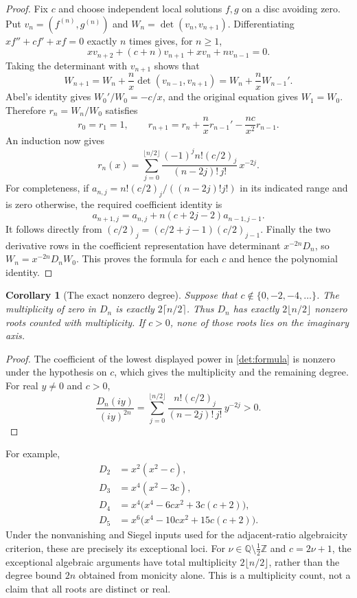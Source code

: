 \documentclass[11pt,a4paper]{article}
\newtheorem{corollary}[theorem]{Corollary}
\theoremstyle{definition}\newtheorem{definition}[theorem]{Definition}
\theoremstyle{remark}\newtheorem{remark}[theorem]{Remark}
\begin{document}
\begin{proof}
Fix $c$ and choose independent local solutions $f,g$ on a disc avoiding
zero.  Put $v_n=(f^{(n)},g^{(n)})$ and
$W_n=\det(v_n,v_{n+1})$.  Differentiating
$xf''+cf'+xf=0$ exactly $n$ times gives, for $n\ge1$,
\[
 xv_{n+2}+(c+n)v_{n+1}+xv_n+nv_{n-1}=0.
\]
Taking the determinant with $v_{n+1}$ shows that
\[
 W_{n+1}=W_n+\frac n x\det(v_{n-1},v_{n+1})
         =W_n+\frac n x W_{n-1}'.
\]
Abel's identity gives $W_0'/W_0=-c/x$, and the original equation gives
$W_1=W_0$.  Therefore $r_n=W_n/W_0$ satisfies
\[
 r_0=r_1=1,\qquad
 r_{n+1}=r_n+\frac n x r_{n-1}'-\frac{nc}{x^2}r_{n-1}.
\]
An induction now gives
\[
 r_n(x)=\sum_{j=0}^{\lfloor n/2\rfloor}
 \frac{(-1)^j n!(c/2)_j}{(n-2j)!\,j!}\,x^{-2j}.
\]
For completeness, if
$a_{n,j}=n!(c/2)_j/((n-2j)!j!)$ in its indicated range and is zero
otherwise, the required coefficient identity is
\[
 a_{n+1,j}=a_{n,j}+n(c+2j-2)a_{n-1,j-1}.
\]
It follows directly from $(c/2)_j=(c/2+j-1)(c/2)_{j-1}$.
Finally the two derivative rows in the coefficient representation have
determinant $x^{-2n}D_n$, so $W_n=x^{-2n}D_nW_0$.
This proves the formula for each $c$ and hence the polynomial identity.
\end{proof}

\begin{corollary}[The exact nonzero degree]\label{det:degree}
Suppose that $c\notin\{0,-2,-4,\ldots\}$.  The multiplicity of zero
in $D_n$ is exactly $2\lceil n/2\rceil$.  Thus $D_n$ has exactly
$2\lfloor n/2\rfloor$ nonzero roots counted with multiplicity.
If $c>0$, none of those roots lies on the imaginary axis.
\end{corollary}

\begin{proof}
The coefficient of the lowest displayed power in
\eqref{det:formula} is nonzero under the hypothesis on $c$, which gives
the multiplicity and the remaining degree.  For real $y\ne0$ and $c>0$,
\[
 \frac{D_n(iy)}{(iy)^{2n}}
 =\sum_{j=0}^{\lfloor n/2\rfloor}
 \frac{n!(c/2)_j}{(n-2j)!\,j!}\,y^{-2j}>0.
\]
\end{proof}

For example,
\begin{align*}
 D_2&=x^2(x^2-c),\\
 D_3&=x^4(x^2-3c),\\
 D_4&=x^4\bigl(x^4-6cx^2+3c(c+2)\bigr),\\
 D_5&=x^6\bigl(x^4-10cx^2+15c(c+2)\bigr).
\end{align*}
Under the nonvanishing and Siegel inputs used for the adjacent-ratio
algebraicity criterion, these are precisely its exceptional loci.
For $\nu\in\mathbb Q\setminus\tfrac12\mathbb Z$ and $c=2\nu+1$,
the exceptional algebraic arguments have total multiplicity
$2\lfloor n/2\rfloor$, rather than the degree bound $2n$ obtained
from monicity alone.  This is a multiplicity count, not a claim that
all roots are distinct or real.
\end{document}
